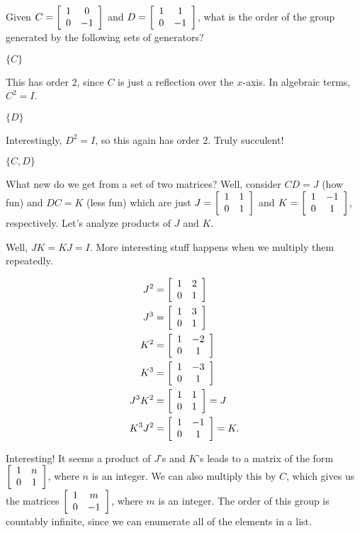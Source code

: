 \documentclass[../key.tex]{subfiles}
\begin{document}
\begin{outer_problem}
\item Given $C=\left[\begin{array}{cc} 1 & 0 \\ 0 & -1 \end{array}\right]$ and $D=\left[\begin{array}{cc} 1 & 1 \\ 0 & -1 \end{array}\right]$, what is the order of the group generated by the following sets of generators?
\end{outer_problem}

\begin{inner_problem}[start=1]
\item $\{C\}$
\end{inner_problem}

This has order $2$, since $C$ is just a reflection over the $x$-axis. In algebraic terms, $C^2=I$.

\begin{inner_problem}
\item $\{D\}$
\end{inner_problem}

Interestingly, $D^2=I$, so this again has order $2$. Truly succulent!

\begin{inner_problem}
\item $\{C,D\}$
\end{inner_problem}

What new do we get from a set of two matrices? Well, consider $CD=J$ (how fun) and $DC=K$ (less fun) which are just $J=\left[\begin{array}{cc} 1 & 1 \\ 0 & 1 \end{array}\right]$ and $K=\left[\begin{array}{cc} 1 & -1 \\ 0 & 1 \end{array}\right]$, respectively. Let's analyze products of $J$ and $K$.

Well, $JK = KJ = I$. More interesting stuff happens when we multiply them repeatedly.

\begin{align*}
J^2 &= \left[\begin{array}{cc} 1 & 2 \\ 0 & 1 \end{array}\right] \\
J^3 &= \left[\begin{array}{cc} 1 & 3 \\ 0 & 1 \end{array}\right] \\
K^2 &= \left[\begin{array}{cc} 1 & -2 \\ 0 & 1 \end{array}\right] \\
K^3 &= \left[\begin{array}{cc} 1 & -3 \\ 0 & 1 \end{array}\right] \\
J^3K^2 &= \left[\begin{array}{cc} 1 & 1 \\ 0 & 1 \end{array}\right] = J \\
K^3J^2 &= \left[\begin{array}{cc} 1 & -1 \\ 0 & 1 \end{array}\right] = K. \\
\end{align*}

Interesting! It seems a product of $J$'s and $K$'s leads to a matrix of the form $\left[\begin{array}{cc} 1 & n \\ 0 & 1 \end{array}\right]$, where $n$ is an integer. We can also multiply this by $C$, which gives us the matrices $\left[\begin{array}{cc} 1 & m \\ 0 & -1 \end{array}\right]$, where $m$ is an integer. The order of this group is countably infinite, since we can enumerate all of the elements in a list.
\end{document}

